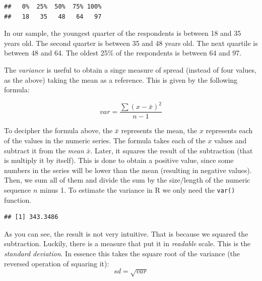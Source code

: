 \documentclass[
]{book}
\newenvironment{Shaded}{\begin{snugshade}}{\end{snugshade}}
\newcommand{\AttributeTok}[1]{\textcolor[rgb]{0.13,0.29,0.53}{#1}}
\newcommand{\FunctionTok}[1]{\textcolor[rgb]{0.13,0.29,0.53}{\textbf{#1}}}
\newcommand{\NormalTok}[1]{#1}
\newcommand{\SpecialCharTok}[1]{\textcolor[rgb]{0.81,0.36,0.00}{\textbf{#1}}}
\begin{document}
\begin{Shaded}
\end{Shaded}

\begin{verbatim}
##   0%  25%  50%  75% 100% 
##   18   35   48   64   97
\end{verbatim}

In our sample, the youngest quarter of the respondents is between 18 and 35 years old. The second quarter is between 35 and 48 years old. The next quartile is between 48 and 64. The oldest 25\% of the respondents is between 64 and 97.

The \emph{variance} is useful to obtain a singe measure of spread (instead of four values, as the above) taking the mean as a reference. This is given by the following formula:

\[ var = \frac{ \sum(x - \bar{x})^2 }{n-1 } \]

To decipher the formula above, the \(\bar{x}\) represents the mean, the \(x\) represents each of the values in the numeric series. The formula takes each of the \(x\) values and subtract it from the \emph{mean} \(\bar{x}\). Later, it squares the result of the subtraction (that is multiply it by itself). This is done to obtain a positive value, since some numbers in the series will be lower than the mean (resulting in negative values). Then, we sum all of them and divide the sum by the size/length of the numeric sequence \(n\) minus 1. To estimate the variance in R we only need the \texttt{var()} function.

\begin{Shaded}
\end{Shaded}

\begin{verbatim}
## [1] 343.3486
\end{verbatim}

As you can see, the result is not very intuitive. That is because we squared the subtraction. Luckily, there is a measure that put it in \emph{readable} scale. This is the \emph{standard deviation}. In essence this takes the square root of the variance (the reversed operation of squaring it):
\[sd=\sqrt{var}\]
\end{document}
